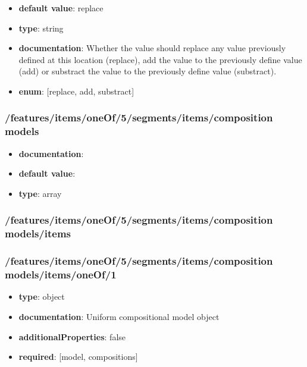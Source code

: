\begin{itemize}\item {\bf default value}: replace
\item {\bf type}: string
\item {\bf documentation}: Whether the value should replace any value previously defined at this location (replace), add the value to the previously define value (add) or substract the value to the previously define value (substract).
\item {\bf enum}: [replace, add, substract]\end{itemize}\subsubsection{/features/items/oneOf/5/segments/items/composition models}
\begin{itemize}\item {\bf documentation}: 
\item {\bf default value}: 
\item {\bf type}: array
\end{itemize}\subsubsection{/features/items/oneOf/5/segments/items/composition models/items}

\subsubsection{/features/items/oneOf/5/segments/items/composition models/items/oneOf/1}
\begin{itemize}\item {\bf type}: object
\item {\bf documentation}: Uniform compositional model object
\item {\bf additionalProperties}: false
\item {\bf required}: [model, compositions]\end{itemize}

